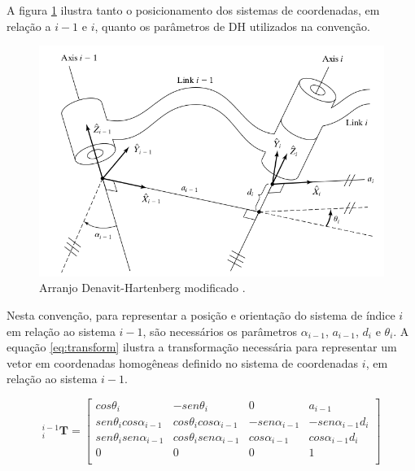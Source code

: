A figura \ref{fig:Craig} ilustra tanto o posicionamento dos sistemas de coordenadas, em relação
a $i-1$ e $i$, quanto os parâmetros de DH utilizados na convenção.

\begin{figure}[ht]
    \caption{Arranjo Denavit-Hartenberg modificado \cite{craig2009introduction}.}    
    \begin{centering}
  
        \includegraphics[width=0.8\columnwidth]{adendo/images/craig.png}
    
    \par\end{centering}
  
    \label{fig:Craig}
\end{figure}

Nesta convenção, para representar a posição e orientação do sistema de 
índice $i$ em relação ao sistema $i-1$, são necessários os parâmetros 
$\alpha_{i-1}$, $a_{i-1}$, $d_i$ e $\theta_i$. 
A equação \ref{eq:transform} ilustra a transformação necessária
para representar um vetor em coordenadas homogêneas definido no 
sistema de coordenadas $i$, em relação ao sistema $i-1$.

\begin{equation}
    \label{eq:transform}
    ^{i-1}_i \textbf{T} = 
    \begin{bmatrix}
        cos\theta_i                 & -sen\theta_i                  & 0                 & a_{i-1}               \\
        sen\theta_icos\alpha_{i-1}  & cos\theta_icos\alpha_{i-1}    & -sen\alpha_{i-1}  & -sen\alpha_{i-1}d_i   \\
        sen\theta_isen\alpha_{i-1}  & cos\theta_isen\alpha_{i-1}    & cos\alpha_{i-1}   & cos\alpha_{i-1}d_i    \\
           0                        &    0                          &    0              &  1                    \\    
    \end{bmatrix}
\end{equation}

